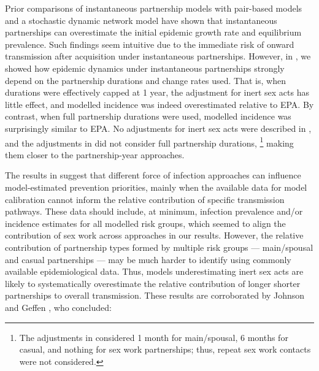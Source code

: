 Prior comparisons of instantaneous partnership models with
pair-based models \cite{Kretzschmar1998,Eames2002,Lloyd-Smith2004} and
a stochastic dynamic network model \cite{Johnson2016mf}
have shown that instantaneous partnerships
can overestimate the initial epidemic growth rate and equilibrium prevalence.
Such findings seem intuitive due to
the immediate risk of onward transmission after acquisition under instantaneous partnerships.
However, in , we showed how
epidemic dynamics under instantaneous partnerships strongly depend
on the partnership durations and change rates used.
That is, when durations were effectively capped at 1 year,
the adjustment for inert sex acts has little effect,
and modelled incidence was indeed overestimated relative to EPA.
By contrast, when full partnership durations were used,
modelled incidence was surprisingly similar to EPA.
No adjustments for inert sex acts were described in \cite{Eames2002,Lloyd-Smith2004}, and
the adjustments in \cite{Johnson2016mf} did not consider full partnership durations,%
\footnote{The adjustments in \cite{Johnson2016mf} considered
  1 month for main/spousal, 6 months for casual, and nothing for sex work partnerships;
  thus, repeat sex work contacts were not considered.}
making them closer to the partnership-year approaches.
\par %
The results in  suggest that
different force of infection approaches can influence model-estimated prevention priorities,
mainly when the available data for model calibration cannot inform
the relative contribution of specific transmission pathways.
These data should include, at minimum,
infection prevalence and/or incidence estimates for all modelled risk groups,
which seemed to align the contribution of sex work across approaches in our results.
However, the relative contribution of partnership types formed by multiple risk groups
--- \eg main/spousal and casual partnerships ---
may be much harder to identify using commonly available epidemiological data.
Thus, models underestimating inert sex acts are likely to systematically overestimate
the relative contribution of longer \vs shorter partnerships to overall transmission.
These results are corroborated by Johnson and Geffen \cite{Johnson2016mf}, who concluded:
